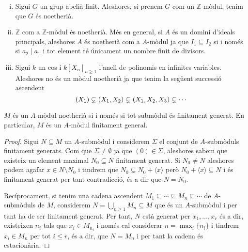 \documentclass[../../../main.tex]{subfiles}
\begin{document}
\begin{ej}
\begin{enumerate}[(i)]
    \item Sigui $G$ un grup abelià finit. Aleshores, si prenem $G$ com un $\mathbb{Z}$-mòdul, tenim que $G$ és noetherià.
    \item $\mathbb{Z}$ com a $\mathbb{Z}$-mòdul és noetherià. Més en general, si $A$ és un domini d'ideals principals, aleshores $A$ és noetherià com a $A$-mòdul ja que $I_1\subseteq I_2$ si i només si $a_2\mid a_1$ i tot element té únicament un nombre finit de divisors.
    \item Sigui $k$ un cos i $k[X_n]_{n\geq 1}$ l'anell de polinomis en infinites variables. Aleshores no és un mòdul noetherià ja que tenim la següent successió ascendent
    \begin{equation}
        \notag
        (X_1)\varsubsetneq(X_1,X_2)\varsubsetneq (X_1,X_2,X_3)\varsubsetneq\cdots 
    \end{equation}
\end{enumerate}
\end{ej}


\begin{prop}
\label{prop:noetheriaFinitamentGenerat} $M$ és un $A$-mòdul noetherià si i només si tot submòdul és finitament generat. En particular, $M$ és un $A$-mòdul finitament general.
\end{prop}
\begin{proof}
Sigui $N\subseteq M$ un $A$-submòdul i considerem $\Sigma$ el conjunt de $A$-submòduls finitament generats. Com que $\Sigma\not=\emptyset$ ja que $(0)\in\Sigma$, aleshores sabem que existeix un element maximal $N_0\subseteq N$ finitament generat. Si $N_0\not=N$ aleshores podem agafar $x\in N\setminus N_0$ i tindrem que $N_0\varsubsetneq N_0+\langle x\rangle$ però $N_0+\langle x\rangle\subseteq N$ i és finitament generat per tant contradicció, és a dir que $N = N_0$.

Recíprocament, si tenim una cadena ascendent $M_1\subseteq \cdots\subseteq M_n\subseteq \cdots$ de $A$-submòduls de $M$, considerem $N = \bigcup_{n\geq 1}M_n\subseteq M$ que és un $A$-submòdul i per tant ha de ser finitament generat. Per tant, $N$ està generat per $x_1,\ldots,x_r$ és a dir, existeixen $n_i$ tals que $x_i\in M_{n_i}$ i només cal considerar $n = \max_i\{n_i\}$ i tindrem $x_i\in M_n$ per tot $i\leq r$, és a dir, que $N = M_n$ i per tant la cadena és estacionària.
\end{proof}
\end{document}
